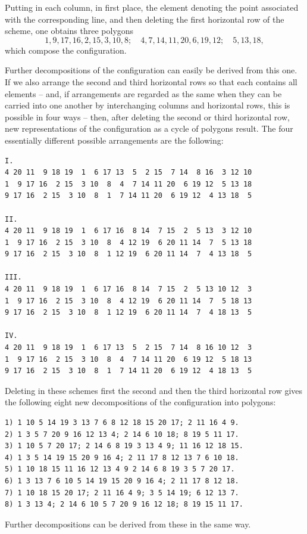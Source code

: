 \documentclass[11pt]{article}
\begin{document}
Putting in each column, in first place, the element denoting the point associated with the corresponding line, and then deleting the first horizontal row of the scheme, one obtains three polygons
\[
1,9,17,16,2,15,3,10,8;\quad 4,7,14,11,20,6,19,12;\quad 5,13,18,
\]
which compose the configuration.

Further decompositions of the configuration can easily be derived from this one. If we also arrange the second and third horizontal rows so that each contains all elements -- and, if arrangements are regarded as the same when they can be carried into one another by interchanging columns and horizontal rows, this is possible in four ways -- then, after deleting the second or third horizontal row, new representations of the configuration as a cycle of polygons result. The four essentially different possible arrangements are the following:
\small
\begin{verbatim}
I.
4 20 11  9 18 19  1  6 17 13  5  2 15  7 14  8 16  3 12 10
1  9 17 16  2 15  3 10  8  4  7 14 11 20  6 19 12  5 13 18
9 17 16  2 15  3 10  8  1  7 14 11 20  6 19 12  4 13 18  5

II.
4 20 11  9 18 19  1  6 17 16  8 14  7 15  2  5 13  3 12 10
1  9 17 16  2 15  3 10  8  4 12 19  6 20 11 14  7  5 13 18
9 17 16  2 15  3 10  8  1 12 19  6 20 11 14  7  4 13 18  5

III.
4 20 11  9 18 19  1  6 17 16  8 14  7 15  2  5 13 10 12  3
1  9 17 16  2 15  3 10  8  4 12 19  6 20 11 14  7  5 18 13
9 17 16  2 15  3 10  8  1 12 19  6 20 11 14  7  4 18 13  5

IV.
4 20 11  9 18 19  1  6 17 13  5  2 15  7 14  8 16 10 12  3
1  9 17 16  2 15  3 10  8  4  7 14 11 20  6 19 12  5 18 13
9 17 16  2 15  3 10  8  1  7 14 11 20  6 19 12  4 18 13  5
\end{verbatim}
\normalsize
Deleting in these schemes first the second and then the third horizontal row gives the following eight new decompositions of the configuration into polygons:
\small
\begin{verbatim}
1) 1 10 5 14 19 3 13 7 6 8 12 18 15 20 17; 2 11 16 4 9.
2) 1 3 5 7 20 9 16 12 13 4; 2 14 6 10 18; 8 19 5 11 17.
3) 1 10 5 7 20 17; 2 14 6 8 19 3 13 4 9; 11 16 12 18 15.
4) 1 3 5 14 19 15 20 9 16 4; 2 11 17 8 12 13 7 6 10 18.
5) 1 10 18 15 11 16 12 13 4 9 2 14 6 8 19 3 5 7 20 17.
6) 1 3 13 7 6 10 5 14 19 15 20 9 16 4; 2 11 17 8 12 18.
7) 1 10 18 15 20 17; 2 11 16 4 9; 3 5 14 19; 6 12 13 7.
8) 1 3 13 4; 2 14 6 10 5 7 20 9 16 12 18; 8 19 15 11 17.
\end{verbatim}
\normalsize
Further decompositions can be derived from these in the same way.
\end{document}
